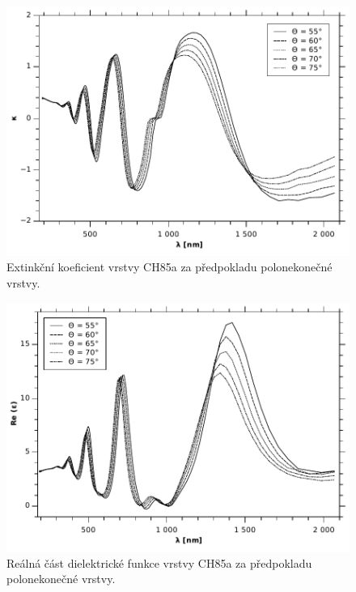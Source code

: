 \documentclass[12pt]{article}
\begin{document}
\begin{figure}
  \centering
  \includegraphics[width=135mm]{img/CH85-k.pdf}
  \caption{Extinkční koeficient vrstvy CH85a za předpokladu polonekonečné vrstvy.}
  \label{CH85k}
\end{figure}

\begin{figure}
  \centering
  \includegraphics[width=135mm]{img/CH85-Ree.pdf}
  \caption{Reálná část dielektrické funkce vrstvy CH85a za předpokladu polonekonečné vrstvy.}
  \label{CH85Ree}
\end{figure}
\end{document}

